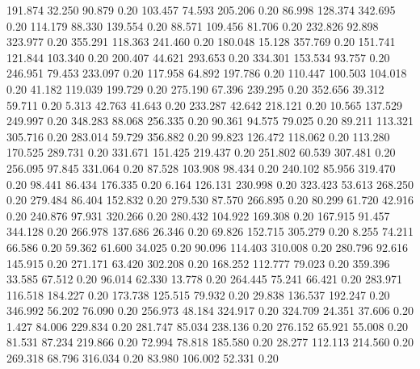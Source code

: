  191.874   32.250   90.879         0.20
 103.457   74.593  205.206         0.20
  86.998  128.374  342.695         0.20
 114.179   88.330  139.554         0.20
  88.571  109.456   81.706         0.20
 232.826   92.898  323.977         0.20
 355.291  118.363  241.460         0.20
 180.048   15.128  357.769         0.20
 151.741  121.844  103.340         0.20
 200.407   44.621  293.653         0.20
 334.301  153.534   93.757         0.20
 246.951   79.453  233.097         0.20
 117.958   64.892  197.786         0.20
 110.447  100.503  104.018         0.20
  41.182  119.039  199.729         0.20
 275.190   67.396  239.295         0.20
 352.656   39.312   59.711         0.20
   5.313   42.763   41.643         0.20
 233.287   42.642  218.121         0.20
  10.565  137.529  249.997         0.20
 348.283   88.068  256.335         0.20
  90.361   94.575   79.025         0.20
  89.211  113.321  305.716         0.20
 283.014   59.729  356.882         0.20
  99.823  126.472  118.062         0.20
 113.280  170.525  289.731         0.20
 331.671  151.425  219.437         0.20
 251.802   60.539  307.481         0.20
 256.095   97.845  331.064         0.20
  87.528  103.908   98.434         0.20
 240.102   85.956  319.470         0.20
  98.441   86.434  176.335         0.20
   6.164  126.131  230.998         0.20
 323.423   53.613  268.250         0.20
 279.484   86.404  152.832         0.20
 279.530   87.570  266.895         0.20
  80.299   61.720   42.916         0.20
 240.876   97.931  320.266         0.20
 280.432  104.922  169.308         0.20
 167.915   91.457  344.128         0.20
 266.978  137.686   26.346         0.20
  69.826  152.715  305.279         0.20
   8.255   74.211   66.586         0.20
  59.362   61.600   34.025         0.20
  90.096  114.403  310.008         0.20
 280.796   92.616  145.915         0.20
 271.171   63.420  302.208         0.20
 168.252  112.777   79.023         0.20
 359.396   33.585   67.512         0.20
  96.014   62.330   13.778         0.20
 264.445   75.241   66.421         0.20
 283.971  116.518  184.227         0.20
 173.738  125.515   79.932         0.20
  29.838  136.537  192.247         0.20
 346.992   56.202   76.090         0.20
 256.973   48.184  324.917         0.20
 324.709   24.351   37.606         0.20
   1.427   84.006  229.834         0.20
 281.747   85.034  238.136         0.20
 276.152   65.921   55.008         0.20
  81.531   87.234  219.866         0.20
  72.994   78.818  185.580         0.20
  28.277  112.113  214.560         0.20
 269.318   68.796  316.034         0.20
  83.980  106.002   52.331         0.20

